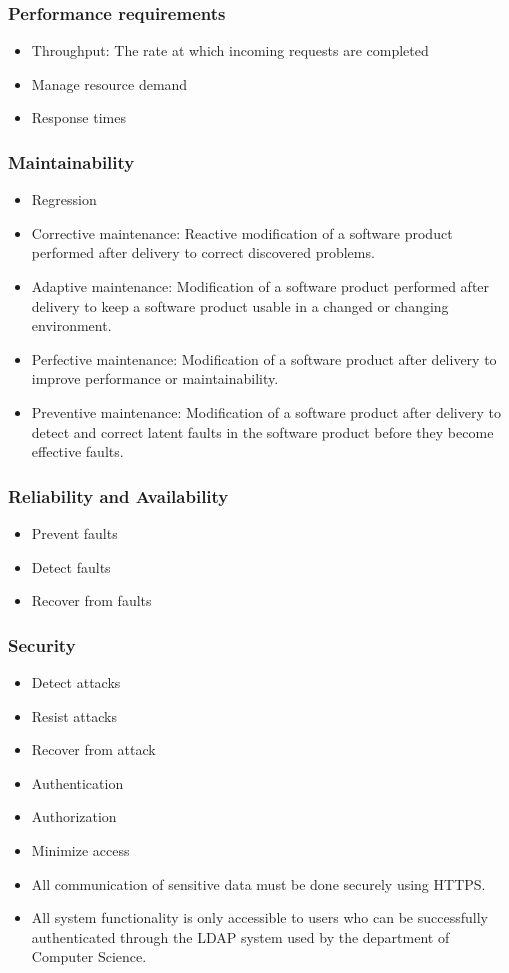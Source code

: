 \documentclass[12pt, oneside]{article}
\begin{document}
		\subsubsection{Performance requirements}
			\begin{itemize}
				\item Throughput: The rate at which incoming requests are completed
				\item Manage resource demand
				\item Response times
			\end{itemize}
		\subsubsection{Maintainability}
			\begin{itemize}
				\item Regression
				\item Corrective maintenance: Reactive modification of a software product performed after delivery to correct discovered problems.
				\item Adaptive maintenance: Modification of a software product performed after delivery to keep a software product usable in a changed or changing environment.
				\item Perfective maintenance: Modification of a software product after delivery to improve performance or maintainability.
				\item Preventive maintenance: Modification of a software product after delivery to detect and correct latent faults in the software product before they become effective faults.
			\end{itemize}
		\subsubsection{Reliability and Availability}
			\begin{itemize}
				\item Prevent faults
				\item Detect faults
				\item Recover from faults
			\end{itemize}
		\subsubsection{Security}
			\begin{itemize}
				\item Detect attacks 
				\item Resist attacks
				\item Recover from attack
				\item Authentication
				\item Authorization
				\item Minimize access
				\item All communication of sensitive data must be done securely using HTTPS.
				\item All system functionality is only accessible to users who can be successfully authenticated through the LDAP system used by the department of Computer Science.
			\end{itemize}
\end{document}
